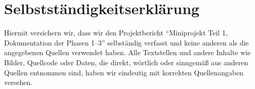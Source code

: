 \chapter*{Selbstständigkeitserklärung}
Hiermit versichern wir, dass wir den Projektbericht ``Miniprojekt Teil 1, Dokumentation der Phasen 1--3'' selbständig verfasst und keine anderen als die angegebenen Quellen verwendet haben.
Alle Textstellen und andere Inhalte wie Bilder, Quellcode oder Daten, die direkt, wörtlich oder sinngemäß aus anderen Quellen entnommen sind, haben wir eindeutig mit korrekten Quellenangaben versehen.
